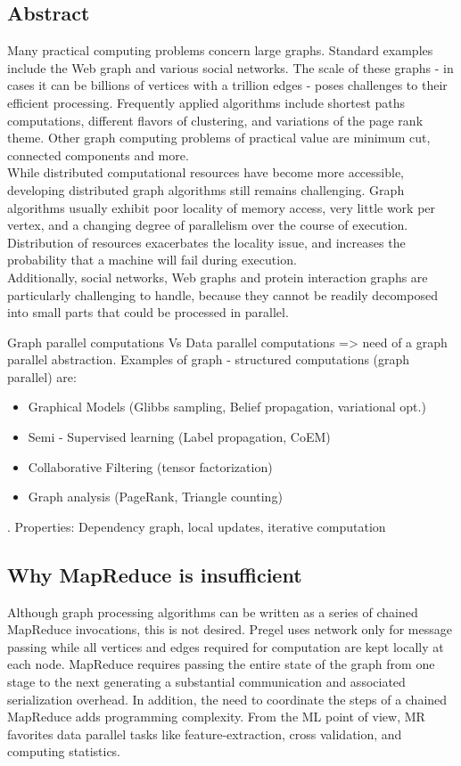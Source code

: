 \documentclass[letterpaper,twocolumn,10pt]{article}
\begin{document}
\subsection*{Abstract}
Many practical computing problems concern large graphs. Standard examples include the Web graph and various social networks. The scale of these graphs - in cases it can be billions of vertices with a trillion edges - poses challenges to their efficient processing.
Frequently applied algorithms include shortest paths computations, different flavors of clustering, and variations of the page rank theme. Other graph computing problems of practical value are minimum cut, connected components and more.\\
While distributed computational resources have become more accessible, developing distributed graph algorithms still remains challenging.
Graph algorithms usually exhibit poor locality of memory access, very little work per vertex, and a changing degree of parallelism over the course of execution. Distribution of resources exacerbates the locality issue, and increases the probability that a machine 
will fail during execution.\\
Additionally, social networks, Web graphs and protein interaction graphs are particularly challenging to handle, because they cannot be readily decomposed into small parts that could be processed in parallel.

Graph parallel computations Vs Data parallel computations => need of a graph parallel abstraction.
Examples of graph - structured computations (graph parallel) are:
\begin{itemize}
	\item Graphical Models (Glibbs sampling, Belief propagation, variational opt.)
	\item Semi - Supervised learning (Label propagation, CoEM)
	\item Collaborative Filtering (tensor factorization)
	\item Graph analysis (PageRank, Triangle counting)
\end{itemize}.
Properties: Dependency graph, local updates, iterative computation

\subsection{Why MapReduce is insufficient}
Although graph processing algorithms can be written as a series of chained MapReduce invocations, this is not desired. Pregel uses network only for message passing while all vertices and edges required for computation are kept locally at each node. MapReduce requires passing the entire state of the graph from one stage to the next generating a substantial communication and associated serialization overhead. In addition, the need to coordinate the steps of a chained MapReduce adds programming complexity.
From the ML point of view, MR favorites data parallel tasks like feature-extraction, cross validation, and computing statistics.
\end{document}
